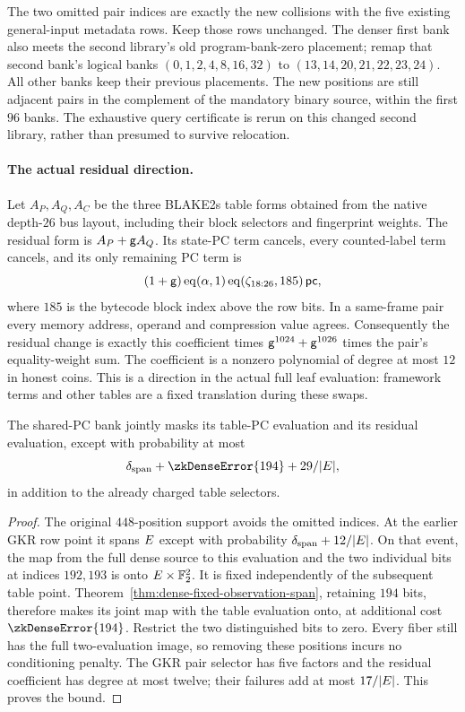 The two omitted pair indices are exactly the new collisions with the five existing general-input metadata rows. Keep those rows unchanged. The denser first bank also meets the second library's old program-bank-zero placement; remap that second bank's logical banks $(0,1,2,4,8,16,32)$ to $(13,14,20,21,22,23,24)$. All other banks keep their previous placements. The new positions are still adjacent pairs in the complement of the mandatory binary source, within the first $96$ banks. The exhaustive query certificate is rerun on this changed second library, rather than presumed to survive relocation.

\paragraph{The actual residual direction.} Let $A_P,A_Q,A_C$ be the three BLAKE2s table forms obtained from the native depth-$26$ bus layout, including their block selectors and fingerprint weights. The residual form is $A_P+\mathsf{g} A_Q$. Its state-PC term cancels, every counted-label term cancels, and its only remaining PC term is
\[
 (1+\mathsf{g})\operatorname{eq}(\alpha,1)\operatorname{eq}(\zeta_{18:26},185)\,\mathsf{pc},
\]
where $185$ is the bytecode block index above the row bits. In a same-frame pair every memory address, operand and compression value agrees. Consequently the residual change is exactly this coefficient times $\mathsf{g}^{1024}+\mathsf{g}^{1026}$ times the pair's equality-weight sum. The coefficient is a nonzero polynomial of degree at most $12$ in honest coins. This is a direction in the actual full leaf evaluation: framework terms and other tables are a fixed translation during these swaps.

\begin{lemma}\label{lem:zk-shared-pc-span}
The shared-PC bank jointly masks its table-PC evaluation and its residual evaluation, except with probability at most
\[
 \delta_{\mathrm{span}}+\zkDenseError{194}+29/|\E|,
\]
in addition to the already charged table selectors.
\end{lemma}
\begin{proof}
The original $448$-position support avoids the omitted indices. At the earlier GKR row point it spans $E$ except with probability $\delta_{\mathrm{span}}+12/|E|$. On that event, the map from the full dense source to this evaluation and the two individual bits at indices $192,193$ is onto $E\times\mathbb{F}_2^2$. It is fixed independently of the subsequent table point. Theorem~\ref{thm:dense-fixed-observation-span}, retaining $194$ bits, therefore makes its joint map with the table evaluation onto, at additional cost $\zkDenseError{194}$. Restrict the two distinguished bits to zero. Every fiber still has the full two-evaluation image, so removing these positions incurs no conditioning penalty. The GKR pair selector has five factors and the residual coefficient has degree at most twelve; their failures add at most $17/|E|$. This proves the bound.
\end{proof}

